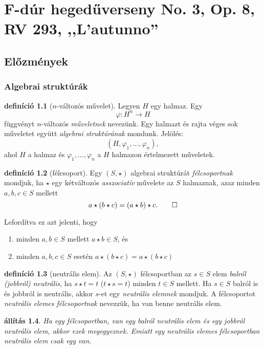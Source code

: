 \documentclass[9pt,showtrims]{memoir}
\theoremstyle{plain}
\newtheorem{proposition}{állítás}[chapter]
\theoremstyle{remark}
\theoremstyle{definition}
\newtheorem{definition}[proposition]{definíció}
\begin{document}
\part{F-dúr hegedűverseny No. 3, Op. 8, RV 293, ,,L'autunno''}
\chapter{Előzmények}
\section{Algebrai struktúrák}
\begin{definition}[$n$-változós művelet]
    Legyen $H$ egy halmaz. Egy 
    \[
        \varphi\colon H^n\to H
    \]
    függvényt $n$-változós \emph{műveletnek} nevezünk.
    Egy halmazt és rajta véges sok műveletet együtt \emph{algebrai struktúrának} mondunk.
    Jelölés: 
    $$\left(H,\varphi_1,\dots,\varphi_n  \right),$$ 
    ahol $H$ a halmaz és
    $\varphi_1,\dots,\varphi_n$ a $H$ halmazon értelmezett műveletek.
\end{definition}
\begin{definition}[félcsoport]
    Egy $\left( S,\star \right)$ algebrai struktúrát \emph{félcsoportnak} mondjuk,
    ha $\star$ egy kétváltozós \emph{asszociatív}
    művelete az $S$ halmaznak,
    azaz minden $a,b,c\in S$ mellett
    \[
        a\star\left( b\star c \right)=\left( a\star b\right)\star c.\qedhere
    \]
\end{definition}
Lefordítva ez azt jelenti, hogy 
\begin{enumerate}
    \item minden $a,b\in S$ mellett $a\star b\in S$, és
    \item minden $a,b,c\in S$ esetén $a\star\left( b\star c \right)=a\star\left( b\star c \right)$
\end{enumerate}
\begin{definition}[neutrális elem]
    Az $\left( S,\star \right)$ félcsoportban az $s\in S$ elem \emph{balról (jobbról) neutrális},
    ha $s\star t=t$ ($t\star s=t$) minden $t\in S$ mellett.
    Ha $s\in S$ balról is és jobbról is neutrális, akkor $s$-et egy \emph{neutrális elemnek}
    mondjuk.
    A félcsoportot \emph{neutrális elemes félcsoportnak} nevezzük, ha van benne neutrális elem.
\end{definition}
\begin{proposition}
    Ha egy félcsoportban, van egy balról neutrális elem és egy jobbról neutrális elem, 
    akkor ezek megegyeznek. 
    Emiatt egy neutrális elemes félcsoportban neutrális elem csak egy van.
\end{proposition}
\end{document}
